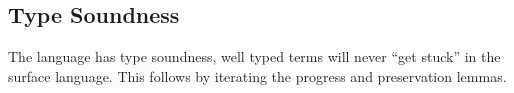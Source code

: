 \subsection{Type Soundness}

The language has type soundness, well typed terms will never ``get stuck'' in the surface language.
This follows by iterating the progress and preservation lemmas.













